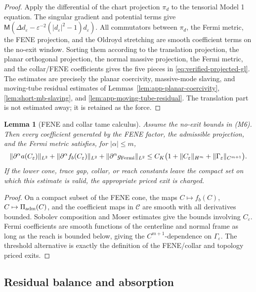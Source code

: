 \documentclass[11pt]{article}
\newtheorem{lemma}[theorem]{Lemma}
\theoremstyle{definition}
\newcommand{\eps}{\varepsilon}
\newcommand{\Mmob}{\mathsf M}
\begin{document}
\begin{proof}
Apply the differential of the chart projection \(\pi_d\) to the tensorial
Model 1 equation.  The singular gradient and potential terms give
\(\Mmob(\Delta d_\eps-\eps^{-2}(|d_\eps|^2-1)d_\eps)\).  All commutators between
\(\pi_d\), the Fermi metric, the FENE projection, and the Oldroyd stretching are
smooth coefficient terms on the no-exit window.  Sorting them according to the
translation projection, the planar orthogonal projection, the normal massive
projection, the Fermi metric, and the collar/FENE coefficients gives the five
pieces in \eqref{eq:verified-projected-gl}.  The estimates are precisely the
planar coercivity, massive-mode slaving, and moving-tube residual estimates of
Lemmas~\ref{lem:app-planar-coercivity}, \ref{lem:short-mb-slaving}, and
\ref{lem:app-moving-tube-residual}.  The translation part is not estimated away;
it is retained as the force.
\end{proof}

\begin{lemma}[FENE and collar tame calculus]
\label{lem:app-fene-collar-tame}
Assume the no-exit bounds in (M6).  Then every coefficient generated by the
FENE factor, the admissible projection, and the Fermi metric satisfies, for
\(|\alpha|\le m\),
\[
        \|\partial^\alpha a(C_\eps)\|_{L^2}
        +\|\partial^\alpha f_b(C_\eps)\|_{L^2}
        +\|\partial^\alpha g_{\rm Fermi}\|_{L^2}
        \le C_K\bigl(1+\|C_\eps\|_{H^m}
        +\|\Gamma_\eps\|_{C^{m+1}}\bigr).
\]
If the lower cone, trace gap, collar, or reach constants leave the compact set
on which this estimate is valid, the appropriate priced exit is charged.
\end{lemma}

\begin{proof}
On a compact subset of the FENE cone, the maps
\(C\mapsto f_b(C)\), \(C\mapsto\Pi_{\rm adm}(C)\), and the coefficient maps in
\(\mathcal C\) are smooth with all derivatives bounded.  Sobolev composition
and Moser estimates give the bounds involving \(C_\eps\).  Fermi coefficients
are smooth functions of the centerline and normal frame as long as the reach is
bounded below, giving the \(C^{m+1}\)-dependence on \(\Gamma_\eps\).  The
threshold alternative is exactly the definition of the FENE/collar and topology
priced exits.
\end{proof}

\subsection{Residual balance and absorption}
\end{document}
